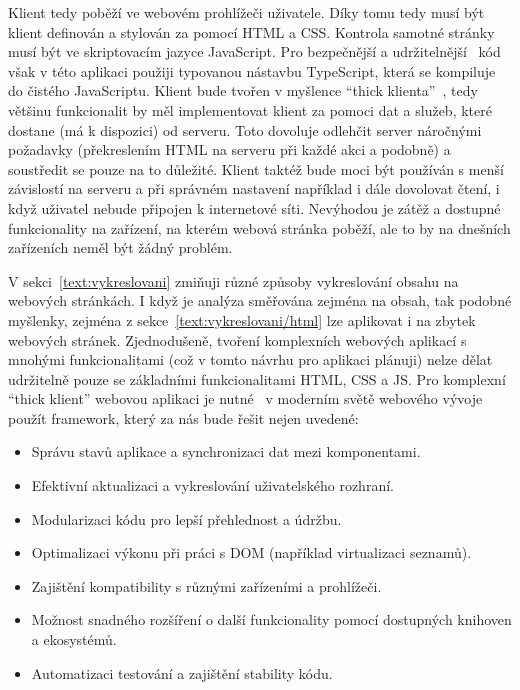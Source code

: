 Klient tedy poběží ve webovém prohlížeči uživatele.
Díky tomu tedy musí být klient definován a stylován za pomocí HTML a CSS.
Kontrola samotné stránky musí být ve skriptovacím jazyce JavaScript.
Pro bezpečnější a udržitelnější~\cite{typescript_docs} kód však v této aplikaci použiji typovanou nástavbu TypeScript, která se kompiluje do čistého JavaScriptu.
Klient bude tvořen v myšlence \enquote{thick klienta}~\cite{uzayr2022frontend}, tedy většinu funkcionalit by měl implementovat klient za pomoci dat a služeb, které dostane (má k dispozici) od serveru.
Toto dovoluje odlehčit server náročnými požadavky (překreslením HTML na serveru při každé akci a podobně) a soustředit se pouze na to důležité.
Klient taktéž bude moci být používán s menší závislostí na serveru a při správném nastavení například i dále dovolovat čtení, i když uživatel nebude připojen k internetové síti.
Nevýhodou je zátěž a dostupné funkcionality na zařízení, na kterém webová stránka poběží, ale to by na dnešních zařízeních neměl být žádný problém.

V sekci~\ref{text:vykreslovani} zmiňuji různé způsoby vykreslování obsahu na webových stránkách.
I když je analýza směřována zejména na obsah, tak podobné myšlenky, zejména z sekce~\ref{text:vykreslovani/html} lze aplikovat i na zbytek webových stránek.
Zjednodušeně, tvoření komplexních webových aplikací s mnohými funkcionalitami (což v tomto návrhu pro aplikaci plánuji) nelze dělat udržitelně pouze se základními funkcionalitami HTML, CSS a JS.
Pro komplexní \enquote{thick klient} webovou aplikaci je nutné~\cite{uzayr2022frontend} v moderním světě webového vývoje použít framework, který za nás bude řešit nejen uvedené:

\begin{itemize}
    \item Správu stavů aplikace a synchronizaci dat mezi komponentami.
    \item Efektivní aktualizaci a vykreslování uživatelského rozhraní.
    \item Modularizaci kódu pro lepší přehlednost a údržbu.
    \item Optimalizaci výkonu při práci s DOM (například virtualizaci seznamů).
    \item Zajištění kompatibility s různými zařízeními a prohlížeči.
    \item Možnost snadného rozšíření o další funkcionality pomocí dostupných knihoven a ekosystémů.
    \item Automatizaci testování a zajištění stability kódu.
\end{itemize}

